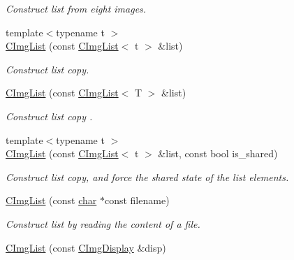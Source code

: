 \begin{DoxyCompactItemize}
\begin{DoxyCompactList}\small\item\em Construct list from eight images. \end{DoxyCompactList}\item 
{\footnotesize template$<$typename t $>$ }\\\hyperlink{structcimg__library__suffixed_1_1CImgList_a03d5f7871e8d0eb6369ae73e446f3a65}{C\+Img\+List} (const \hyperlink{structcimg__library__suffixed_1_1CImgList}{C\+Img\+List}$<$ t $>$ \&list)
\begin{DoxyCompactList}\small\item\em Construct list copy. \end{DoxyCompactList}\item 
\mbox{\label{structcimg__library__suffixed_1_1CImgList_a39ebd29c327a7b6db44cf572142c8515}} 
\hyperlink{structcimg__library__suffixed_1_1CImgList_a39ebd29c327a7b6db44cf572142c8515}{C\+Img\+List} (const \hyperlink{structcimg__library__suffixed_1_1CImgList}{C\+Img\+List}$<$ T $>$ \&list)
\begin{DoxyCompactList}\small\item\em Construct list copy . \end{DoxyCompactList}\item 
{\footnotesize template$<$typename t $>$ }\\\hyperlink{structcimg__library__suffixed_1_1CImgList_aab7354258426b0c99e502eda3765b056}{C\+Img\+List} (const \hyperlink{structcimg__library__suffixed_1_1CImgList}{C\+Img\+List}$<$ t $>$ \&list, const bool is\+\_\+shared)
\begin{DoxyCompactList}\small\item\em Construct list copy, and force the shared state of the list elements. \end{DoxyCompactList}\item 
\hyperlink{structcimg__library__suffixed_1_1CImgList_ac394d73bac5abc6aec337bc457695bdc}{C\+Img\+List} (const \hyperlink{classchar}{char} $\ast$const filename)
\begin{DoxyCompactList}\small\item\em Construct list by reading the content of a file. \end{DoxyCompactList}\item 
\hyperlink{structcimg__library__suffixed_1_1CImgList_a32dbe3f9509eb41b2a18f4b68c737b39}{C\+Img\+List} (const \hyperlink{structcimg__library__suffixed_1_1CImgDisplay}{C\+Img\+Display} \&disp)

\end{DoxyCompactItemize}
